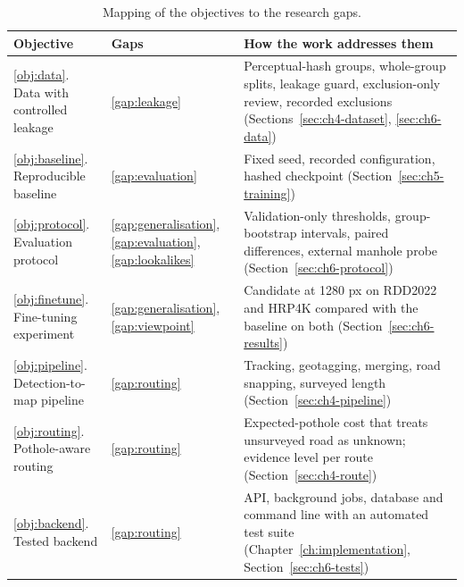 \begin{table}[!htbp]
\centering
\small
\renewcommand{\arraystretch}{1.2}
\begin{tabular}{|L{3.6cm}|L{1.8cm}|L{7.4cm}|}
\hline
\textbf{Objective} & \textbf{Gaps} & \textbf{How the work addresses them} \\
\hline
\ref{obj:data}. Data with controlled leakage & \ref{gap:leakage} & Perceptual-hash groups, whole-group splits, leakage guard, exclusion-only review, recorded exclusions (Sections~\ref{sec:ch4-dataset}, \ref{sec:ch6-data}) \\
\hline
\ref{obj:baseline}. Reproducible baseline & \ref{gap:evaluation} & Fixed seed, recorded configuration, hashed checkpoint (Section~\ref{sec:ch5-training}) \\
\hline
\ref{obj:protocol}. Evaluation protocol & \ref{gap:generalisation}, \ref{gap:evaluation}, \ref{gap:lookalikes} & Validation-only thresholds, group-bootstrap intervals, paired differences, external manhole probe (Section~\ref{sec:ch6-protocol}) \\
\hline
\ref{obj:finetune}. Fine-tuning experiment & \ref{gap:generalisation}, \ref{gap:viewpoint} & Candidate at 1280 px on RDD2022 and HRP4K compared with the baseline on both (Section~\ref{sec:ch6-results}) \\
\hline
\ref{obj:pipeline}. Detection-to-map pipeline & \ref{gap:routing} & Tracking, geotagging, merging, road snapping, surveyed length (Section~\ref{sec:ch4-pipeline}) \\
\hline
\ref{obj:routing}. Pothole-aware routing & \ref{gap:routing} & Expected-pothole cost that treats unsurveyed road as unknown; evidence level per route (Section~\ref{sec:ch4-route}) \\
\hline
\ref{obj:backend}. Tested backend & \ref{gap:routing} & API, background jobs, database and command line with an automated test suite (Chapter~\ref{ch:implementation}, Section~\ref{sec:ch6-tests}) \\
\hline
\end{tabular}
\caption{Mapping of the objectives to the research gaps.}
\label{tab:ch2-mapping}
\end{table}
